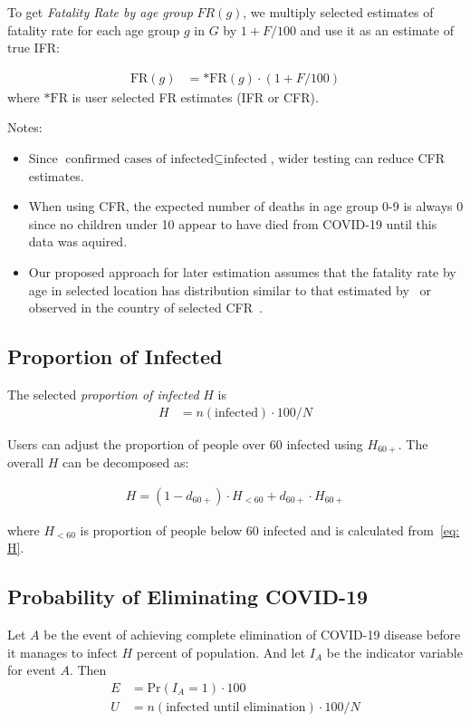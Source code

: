 \documentclass[12pt]{article}
\begin{document}
To get {\it Fatality Rate by age group} $FR(g)$, we multiply selected estimates of fatality rate for each age group $g$ in $G$ by $1 + F/100$ and use it as an estimate of true IFR:

\begin{align*}
\text{FR}(g) &=
   \text{*FR}(g) \cdot (1 + F/100)
\end{align*}
where $\text{*FR}$ is user selected FR estimates (IFR or CFR).

Notes:
\begin{itemize}
\item Since $\text{confirmed cases of infected} \subseteq \text{infected}$, wider testing can reduce CFR estimates.
\item When using CFR, the expected number of deaths in age group 0-9 is always 0 since no children under 10 appear to have died from COVID-19 until this data was aquired.
\item Our proposed approach for later estimation assumes that the fatality rate by age in selected location has distribution similar to that estimated by~\cite{imperial} or observed in the country of selected CFR~\cite{cfrs}.
\end{itemize}

\subsection*{Proportion of Infected}
The selected {\it proportion of infected} $H$ is
\begin{align*}
H &= n(\text{infected}) \cdot 100 / N
\end{align*}


Users can adjust the proportion of people over 60 infected using $H_{60+}$. The overall $H$ can be decomposed as:

\begin{align}\label{eq: H}
H = (1 - d_{60+}) \cdot H_{<60} + d_{60+} \cdot H_{60+}
\end{align}

where $H_{<60}$ is proportion of people below 60 infected and is calculated from~\ref{eq: H}.

\subsection*{Probability of Eliminating COVID-19}
Let $A$ be the event of achieving complete elimination of COVID-19 disease before it manages to infect $H$ percent of population. And let $I_{A}$ be the indicator variable for event $A$. Then
\begin{align*}
E &= \text{Pr}(I_{A} = 1) \cdot 100 \\
U &= n(\text{infected until elimination}) \cdot 100 / N
\end{align*}
\end{document}
